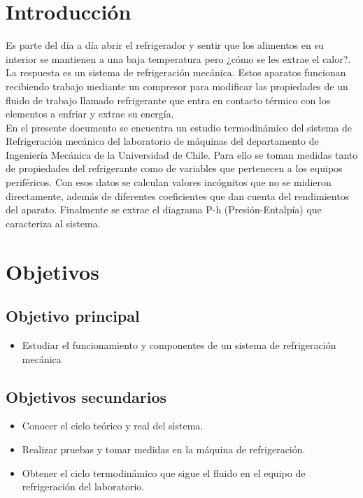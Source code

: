 \documentclass[11pt,letterpaper]{extarticle}        %
\numberwithin{equation}{section}                    %
\begin{document}
\pagestyle{fancy}
\thispagestyle{NoPortadaNoEnumerada}

\newpage
\tableofcontents        %
\newpage
\listoffigures          %
\listoftables           %


\newpage
\setcounter{page}{1}
\pagestyle{NoPortada}

\section{Introducción}
Es parte del día a día abrir el refrigerador y sentir que los alimentos en su interior se mantienen a una baja temperatura pero ¿cómo se les extrae el calor?. La respuesta es un sistema de refrigeración mecánica. Estos aparatos funcionan recibiendo trabajo mediante un compresor para modificar las propiedades de un fluido de trabajo llamado refrigerante que entra en contacto térmico con los elementos a enfriar y extrae su energía.\\

En el presente documento se encuentra un estudio termodinámico del sistema de Refrigeración mecánica del laboratorio de máquinas del departamento de Ingeniería Mecánica de la Universidad de Chile. Para ello se toman medidas tanto de propiedades del refrigerante como de variables que pertenecen a los equipos periféricos. Con esos datos se calculan valores incógnitos que no se midieron directamente, además de diferentes coeficientes que dan cuenta del rendimientos del aparato. Finalmente se extrae el diagrama P-h (Presión-Entalpía) que caracteriza al sistema.

\section{Objetivos}
\subsection*{Objetivo principal}
\begin{itemize}
\item Estudiar el funcionamiento  y componentes de un sistema de refrigeración mecánica
\end{itemize}
\subsection*{Objetivos secundarios}
\begin{itemize}
\item Conocer el ciclo teórico y real del sistema.
\item Realizar pruebas y tomar medidas en la máquina de refrigeración.
\item Obtener el ciclo termodinámico que sigue el fluido en el equipo de refrigeración del laboratorio.
\end{itemize}
\end{document}
